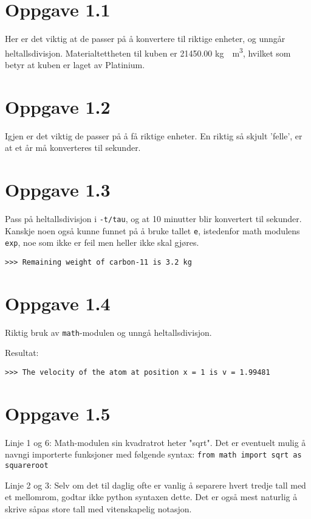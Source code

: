 \documentclass[10pt,a4paper]{article}
\begin{document}
\section*{Oppgave 1.1}
Her er det viktig at de passer på å konvertere til riktige enheter, og unngår heltallsdivisjon. Materialtettheten til kuben er 21450.00 \si{\kg.\per\cubic\meter}, hvilket som betyr at kuben er laget av Platinium. 




\section*{Oppgave 1.2}
Igjen er det viktig de passer på å få riktige enheter. En riktig så skjult 'felle', er at et år må konverteres til sekunder. 


\section*{Oppgave 1.3}
Pass på heltallsdivisjon i \texttt{-t/tau}, og at 10 minutter blir konvertert til sekunder. Kanskje noen også kunne funnet på å bruke tallet \texttt{e}, istedenfor math modulens \texttt{exp}, noe som ikke er feil men heller ikke skal gjøres.


\begin{verbatim}
>>> Remaining weight of carbon-11 is 3.2 kg
\end{verbatim}

\newpage
\section*{Oppgave 1.4}
Riktig bruk av \texttt{math}-modulen og unngå heltallsdivisjon.

Resultat:
\begin{verbatim}
>>> The velocity of the atom at position x = 1 is v = 1.99481
\end{verbatim}

\section*{Oppgave 1.5}
Linje 1 og 6: Math-modulen sin kvadratrot heter "sqrt". Det er eventuelt mulig å navngi importerte funksjoner med følgende syntax: \texttt{from math import sqrt as squareroot}

Linje 2 og 3: Selv om det til daglig ofte er vanlig å separere hvert tredje tall med et mellomrom, godtar ikke python syntaxen dette. Det er også mest naturlig å skrive såpas store tall med vitenskapelig notasjon.
\end{document}
